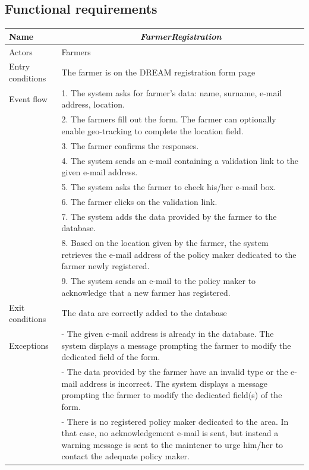 \subsection{Functional requirements}
\begin{table}[H]
	\centering
	\begin{tabularx}{\linewidth}{|l|X|}
		\hline
		Name & \multicolumn{1}{c|}{\textit{\textbf{FarmerRegistration}}}                                                   \tabularnewline \hline
		Actors                                               & Farmers                                                    \tabularnewline \hline
		Entry conditions                                              & The farmer is on the DREAM registration form page                                                                                  \tabularnewline \hline
		Event flow                                         & 1.	The system asks for farmer’s data: name, surname, e-mail address, location.                                                                    \tabularnewline 
		& 2.	The farmers fill out the form. The farmer can optionally enable geo-tracking to complete the location field.                                                   \tabularnewline 
		& 3.	The farmer confirms the responses.                                                   \tabularnewline 
		& 4.	The system sends an e-mail containing a validation link to the given e-mail address.                                                \tabularnewline
		& 5.	The system asks the farmer to check his/her e-mail box.                                               \tabularnewline
		& 6.	The farmer clicks on the validation link.                                     \tabularnewline
		& 7.	The system adds the data provided by the farmer to the database.                                  \tabularnewline
		& 8.	Based on the location given by the farmer, the system retrieves the e-mail address of the policy maker dedicated to the farmer newly registered.                               \tabularnewline
		& 9.	The system sends an e-mail to the policy maker to acknowledge that a new farmer has registered.                              \tabularnewline \hline
		Exit conditions & The data are correctly added to the database
		\tabularnewline \hline
		Exceptions & 
		-	The given e-mail address is already in the database. The system displays a message prompting the farmer to modify the dedicated field of the form.  \tabularnewline
		
		&-	The data provided by the farmer have an invalid type or the e-mail address is incorrect. The system displays a message prompting the farmer to modify the dedicated field(s) of the form. 
		\tabularnewline
		&-	There is no registered policy maker dedicated to the area. In that case, no acknowledgement e-mail is sent, but instead a warning message is sent to the maintener to urge him/her to contact the adequate policy maker. 
		\tabularnewline
		\hline
	\end{tabularx}   
\end{table}

